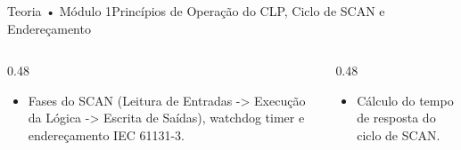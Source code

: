 \begin{senaiframe}{Teoria • Módulo 1}{Princípios de Operação do CLP, Ciclo de SCAN e Endereçamento}
  \begin{columns}[t]
    \begin{column}{0.48\textwidth}
      \begin{tcolorbox}[senaibluecard, title={Fundamentos Teóricos}]
        \begin{itemize}
          \item Fases do SCAN (Leitura de Entradas -> Execução da Lógica -> Escrita de Saídas), watchdog timer e endereçamento IEC 61131-3.
        \end{itemize}
      \end{tcolorbox}
    \end{column}
    \begin{column}{0.48\textwidth}
      \begin{tcolorbox}[senaigreencard, title={Prática \& Laboratório}]
        \begin{itemize}
          \item Cálculo do tempo de resposta do ciclo de SCAN.
        \end{itemize}
      \end{tcolorbox}
    \end{column}
  \end{columns}
\end{senaiframe}
